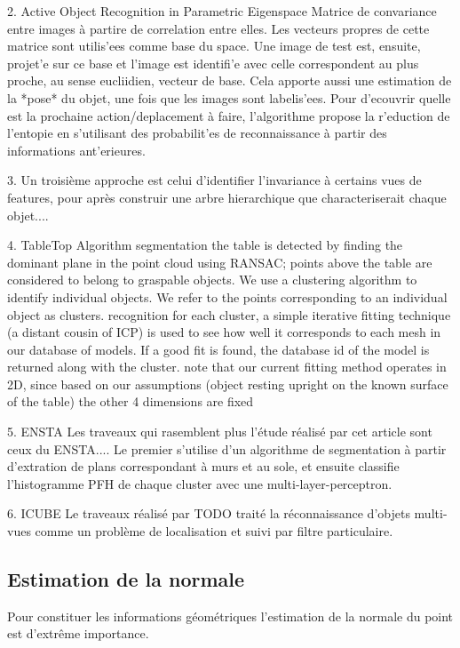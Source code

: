 2. Active Object Recognition in Parametric Eigenspace
Matrice de convariance entre images à partire de correlation entre elles. Les vecteurs propres de cette matrice sont utilis'ees comme base du space. Une image de test est, ensuite, projet'e sur ce base et l'image est identifi'e avec celle correspondent au plus proche, au sense eucliidien, vecteur de base. Cela apporte aussi une estimation de la *pose* du objet, une fois que les images sont labelis'ees. 
Pour d'ecouvrir quelle est la prochaine action/deplacement à faire, l'algorithme propose la r'eduction de l'entopie en s'utilisant des probabilit'es de reconnaissance à partir des informations ant'erieures.


3. 
Un troisième approche est celui d'identifier l'invariance à certains vues de features, pour après construir une arbre hierarchique que characteriserait chaque objet....

4. TableTop Algorithm
segmentation
the table is detected by finding the dominant plane in the point cloud using RANSAC;
points above the table are considered to belong to graspable objects. We use a clustering algorithm to identify individual objects. We refer to the points corresponding to an individual object as clusters.
recognition
for each cluster, a simple iterative fitting technique (a distant cousin of ICP) is used to see how well it corresponds to each mesh in our database of models. If a good fit is found, the database id of the model is returned along with the cluster.
note that our current fitting method operates in 2D, since based on our assumptions (object resting upright on the known surface of the table) the other 4 dimensions are fixed

5. ENSTA 
Les traveaux qui rasemblent plus l'étude réalisé par cet article sont ceux du {\color{blue} ENSTA...}. Le premier s'utilise d'un algorithme de segmentation à partir d'extration de plans correspondant à murs et au sole, et ensuite classifie l'histogramme PFH de chaque cluster avec une multi-layer-perceptron. 

6. ICUBE
Le traveaux réalisé par {\color{blue} TODO } traité la réconnaissance d'objets multi-vues comme un problème de localisation et suivi par filtre particulaire. 

\subsection{Estimation de la normale}

Pour constituer les informations géométriques l'estimation de la normale du point est d'extrême importance. 

